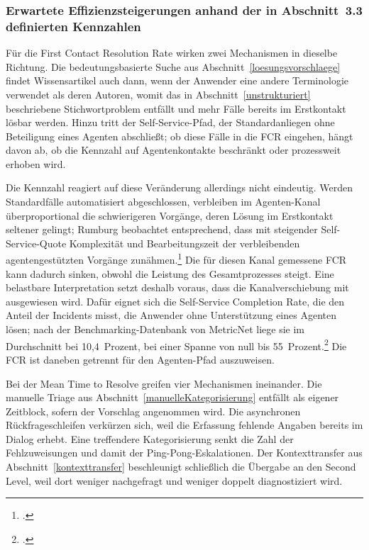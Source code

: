 \subsubsection{Erwartete Effizienzsteigerungen anhand der in Abschnitt~3.3 definierten Kennzahlen}
\label{effizienz}

F\"ur die First Contact Resolution Rate wirken zwei Mechanismen in dieselbe Richtung. Die bedeutungsbasierte Suche aus Abschnitt~\ref{loesungsvorschlaege} findet Wissensartikel auch dann, wenn der Anwender eine andere Terminologie verwendet als deren Autoren, womit das in Abschnitt~\ref{unstrukturiert} beschriebene Stichwortproblem entf\"allt und mehr F\"alle bereits im Erstkontakt l\"osbar werden. Hinzu tritt der Self-Service-Pfad, der Standardanliegen ohne Beteiligung eines Agenten abschlie{\ss}t; ob diese F\"alle in die FCR eingehen, h\"angt davon ab, ob die Kennzahl auf Agentenkontakte beschr\"ankt oder prozessweit erhoben wird.

Die Kennzahl reagiert auf diese Ver\"anderung allerdings nicht eindeutig. Werden Standardf\"alle automatisiert abgeschlossen, verbleiben im Agenten-Kanal \"uberproportional die schwierigeren Vorg\"ange, deren L\"osung im Erstkontakt seltener gelingt; Rumburg beobachtet entsprechend, dass mit steigender Self-Service-Quote Komplexit\"at und Bearbeitungszeit der verbleibenden agentengest\"utzten Vorg\"ange zun\"ahmen.\footcite[Vgl.][hier S.~2]{Rumburg2013} Die f\"ur diesen Kanal gemessene FCR kann dadurch sinken, obwohl die Leistung des Gesamtprozesses steigt. Eine belastbare Interpretation setzt deshalb voraus, dass die Kanalverschiebung mit ausgewiesen wird. Daf\"ur eignet sich die Self-Service Completion Rate, die den Anteil der Incidents misst, die Anwender ohne Unterst\"utzung eines Agenten l\"osen; nach der Benchmarking-Datenbank von MetricNet liege sie im Durchschnitt bei 10,4~Prozent, bei einer Spanne von null bis 55~Prozent.\footcite[Vgl.][S.~1\,f.]{Rumburg2013} Die FCR ist daneben getrennt f\"ur den Agenten-Pfad auszuweisen.

Bei der Mean Time to Resolve greifen vier Mechanismen ineinander. Die manuelle Triage aus Abschnitt~\ref{manuelleKategorisierung} entf\"allt als eigener Zeitblock, sofern der Vorschlag angenommen wird. Die asynchronen R\"uckfrageschleifen verk\"urzen sich, weil die Erfassung fehlende Angaben bereits im Dialog erhebt. Eine treffendere Kategorisierung senkt die Zahl der Fehlzuweisungen und damit der Ping-Pong-Eskalationen. Der Kontexttransfer aus Abschnitt~\ref{kontexttransfer} beschleunigt schlie{\ss}lich die \"Ubergabe an den Second Level, weil dort weniger nachgefragt und weniger doppelt diagnostiziert wird.


